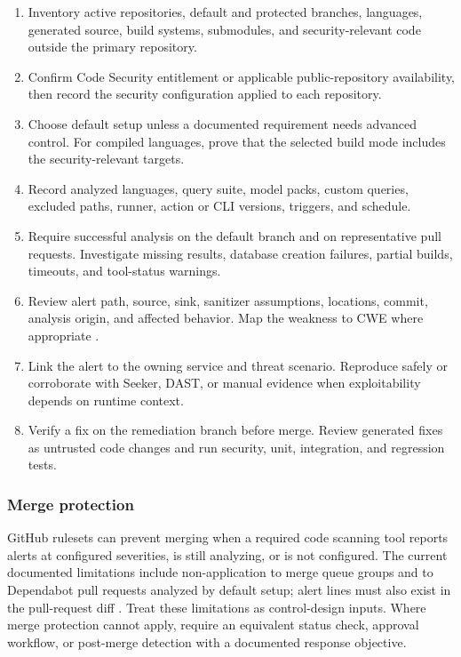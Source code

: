 \documentclass[11pt,letterpaper]{article}
\begin{document}
\begin{enumerate}
  \item Inventory active repositories, default and protected branches, languages, generated source, build systems, submodules, and security-relevant code outside the primary repository.
  \item Confirm Code Security entitlement or applicable public-repository availability, then record the security configuration applied to each repository.
  \item Choose default setup unless a documented requirement needs advanced control. For compiled languages, prove that the selected build mode includes the security-relevant targets.
  \item Record analyzed languages, query suite, model packs, custom queries, excluded paths, runner, action or CLI versions, triggers, and schedule.
  \item Require successful analysis on the default branch and on representative pull requests. Investigate missing results, database creation failures, partial builds, timeouts, and tool-status warnings.
  \item Review alert path, source, sink, sanitizer assumptions, locations, commit, analysis origin, and affected behavior. Map the weakness to CWE where appropriate \citep{mitrecwe}.
  \item Link the alert to the owning service and threat scenario. Reproduce safely or corroborate with Seeker, DAST, or manual evidence when exploitability depends on runtime context.
  \item Verify a fix on the remediation branch before merge. Review generated fixes as untrusted code changes and run security, unit, integration, and regression tests.
\end{enumerate}

\subsubsection{Merge protection}

GitHub rulesets can prevent merging when a required code scanning tool reports alerts at configured severities, is still analyzing, or is not configured. The current documented limitations include non-application to merge queue groups and to Dependabot pull requests analyzed by default setup; alert lines must also exist in the pull-request diff \citep{githubmerge}. Treat these limitations as control-design inputs. Where merge protection cannot apply, require an equivalent status check, approval workflow, or post-merge detection with a documented response objective.
\end{document}
